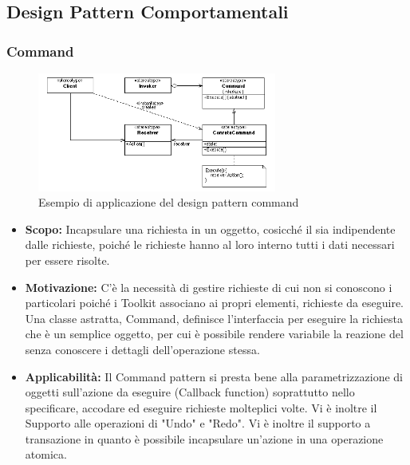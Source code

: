 \documentclass{scalatekids-article}
\begin{document}
\subsection{Design Pattern Comportamentali}

\subsubsection{Command}
\begin{figure}[H]
	\begin{center}
		\includegraphics[width=0.7\textwidth, keepaspectratio]{img/designPattern/CommandPattern.png}
		\caption{Esempio di applicazione del design pattern command}
	\end{center}
\end{figure}
\begin{itemize}
	\item \textbf{Scopo:} Incapsulare una richiesta in un oggetto, cosicché il  sia indipendente dalle richieste, poiché le richieste hanno al loro interno tutti i dati necessari per essere risolte. 
\item \textbf{Motivazione:} C'è la necessità di gestire richieste di cui non si conoscono i particolari poiché i Toolkit associano ai propri elementi, richieste da eseguire.
 Una classe astratta, Command, definisce l’interfaccia per eseguire la richiesta che è un semplice oggetto, per cui è possibile rendere variabile la reazione del  senza conoscere i dettagli dell'operazione stessa.
\item \textbf{Applicabilità:} Il Command pattern si presta bene alla parametrizzazione di oggetti sull’azione da eseguire (Callback function) soprattutto nello specificare, accodare ed eseguire richieste molteplici volte. Vi è inoltre il Supporto alle operazioni di "Undo" e "Redo". Vi è inoltre il supporto a transazione in quanto è possibile incapsulare un'azione in una operazione atomica.
\end{itemize}
\end{document}
